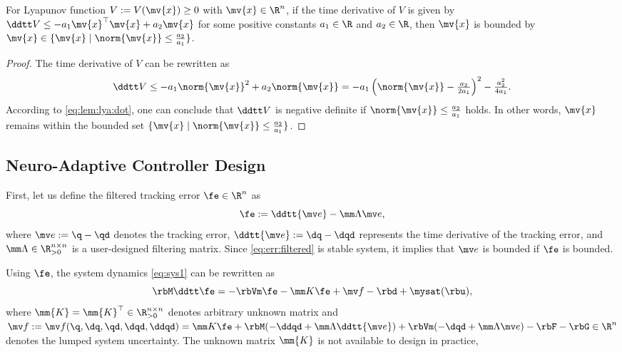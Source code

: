 \documentclass[lettersize,journal]{IEEEtran}
\begin{document}
\begin{lem} \label{lem:stable:set}
    For Lyapunov function $V:=V(\mv{x})\ge0$ with $\mv{x}\in\R^n$, if the time derivative of $V$ is given by $\ddtt V\le -a_1 \mv{x}^\top \mv{x} + a_2 \mv{x}$ for some positive constants $a_1\in\R$ and $a_2\in\R$, then $\mv{x}$ is bounded by $\mv{x}\in\{\mv{x}\mid\norm{\mv{x}}\le\tfrac{a_2}{a_1}\}$.
\end{lem}

\begin{proof}
    The time derivative of $V$ can be rewritten as
    \begin{equation}
        \ddtt V
        \le
        -a_1 \norm{\mv{x}}^2 + a_2 \norm{\mv{x}}
        =
        -a_1
        \left(
            \norm{\mv{x}}-\tfrac{a_2}{2a_1}
        \right)^2
        -
        \tfrac{a_2^2}{4a_1}
        .
        \label{eq:lem:lya:dot}
    \end{equation}
    According to \eqref{eq:lem:lya:dot}, one can conclude that $\ddtt V$ is negative definite if $\norm{\mv{x}}\le\tfrac{a_2}{a_1}$ holds.
    In other words, $\mv{x}$ remains within the bounded set $\{\mv{x}\mid\norm{\mv{x}}\le\tfrac{a_2}{a_1}\}$.
\end{proof}


\subsection{Neuro-Adaptive Controller Design}\label{sec:sub:NAC}

First, let us define the filtered tracking error $\fe\in\R^n$ as 
\begin{equation}
    \fe := \ddtt{\mv e}-\mm\Lambda \mv e
    ,
    \label{eq:err:filtered}
\end{equation}
where $\mv e := \q - \qd$ denotes the tracking error, $\ddtt{\mv e} := \dq - \dqd$ represents the time derivative of the tracking error, and $\mm\Lambda\in\R^{n\times n}_{>0}$ is a user-designed filtering matrix.
Since \eqref{eq:err:filtered} is stable system, it implies that $\mv e$ is bounded if $\fe$ is bounded.

Using $\fe$, the system dynamics \eqref{eq:sys1} can be rewritten as
\begin{equation}
    \rbM \ddtt\fe
    =
    -\rbVm \fe
    -\mm K \fe
    + \mv f
    -\rbd + \mysat(\rbu)
    ,
    \label{eq:sys:filtered}
\end{equation}
where $\mm{K}=\mm{K}^\top\in\R^{n\times n}_{>0}$ denotes arbitrary unknown matrix and $
    \mv f:= \mv f(\q,\dq,\qd,\dqd,\ddqd)
    =
    \mm K \fe
    +\rbM(-\ddqd+\mm\Lambda\ddtt{\mv e})
    +
    \rbVm(-\dqd+\mm\Lambda\mv e)
    -
    \rbF
    -
    \rbG
    \in\R^n
$ denotes the lumped system uncertainty.
\color{red}
The unknown matrix $\mm{K}$ is not available to design in practice, 
\color{black}
\end{document}
